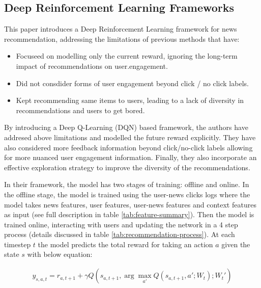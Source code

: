 \documentclass{ieeetj}
\begin{document}
\subsection{Deep Reinforcement Learning Frameworks\cite{zheng_drn_2018}}

This paper introduces a Deep Reinforcement Learning framework for news recommendation, addressing the limitations of previous methods that have:
\begin{itemize}
	\item Focuseed on modelling only the current reward, ignoring the long-term impact of recommendations on user.engagement.
	\item Did not consdider forms of user engagement beyond click / no click labels.
	\item Kept recommending same items to users, leading to a lack of diversity in recommendations and users to get bored.
\end{itemize}
By introducing a Deep Q-Learning (DQN) based framework, the authors have addresed above limitations and modelled the future reward explicitly. They have also considered more feedback information beyond click/no-click labels allowing for more nuanced user engagement information. Finally, they also incorporate an effective exploration strategy to improve the diversity of the recommendations.

In their framework, the model has two stages of training: offline and online. In the offline stage, the model is trained using the user-news clicks logs where the model takes news features, user features, user-news features and context features as input (see full description in table \ref{tab:feature-summary}). Then the model is trained online, interacting with users and updating the network in a 4 step process (details discussed in table \ref{tab:recommendation-process}). At each timestep $t$ the model predicts the total reward for taking an action $a$ given the state $s$ with below equation:

\begin{equation}
\label{eq:Q function}
\begin{aligned}
	y_{s, a, t} = r_{a, t+1} + \gamma Q(s_{a, t+1}, \arg\max_{a'} Q(s_{a, t+1}, a'; W_t); W_t')
\end{aligned}
\end{equation}
\end{document}
